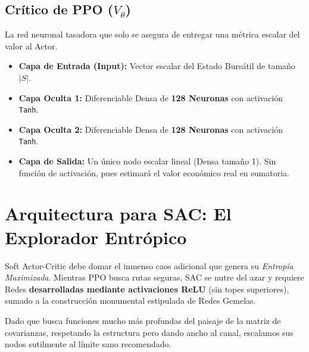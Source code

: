 \documentclass[11pt,a4paper]{article}
\begin{document}
\subsection{Crítico de PPO ($V_\theta$)}
La red neuronal tasadora que solo se asegura de entregar una métrica escalar del valor al Actor.
\begin{itemize}
    \item \textbf{Capa de Entrada (Input):} Vector escalar del Estado Bursátil de tamaño $|S|$.
    \item \textbf{Capa Oculta 1:} Diferenciable Densa de \textbf{128 Neuronas} con activación \texttt{Tanh}.
    \item \textbf{Capa Oculta 2:} Diferenciable Densa de \textbf{128 Neuronas} con activación \texttt{Tanh}.
    \item \textbf{Capa de Salida:} Un único nodo escalar lineal (Densa tamaño 1). Sin función de activación, pues estimará el valor económico real en sumatoria.
\end{itemize}


\section{Arquitectura para SAC: El Explorador Entrópico}
Soft Actor-Critic debe domar el inmenso caos adicional que genera su \textit{Entropía Maximizada}. Mientras PPO busca rutas seguras, SAC se nutre del azar y requiere Redes \textbf{desarrolladas mediante activaciones ReLU} (sin topes superiores), sumado a la construcción monumental estipulada de Redes Gemelas.

Dado que busca funciones mucho más profundas del paisaje de la matriz de covarianzas, respetando la estructura pero dando ancho al canal, escalamos sus nodos sutilmente al límite sano recomendado.
\end{document}
